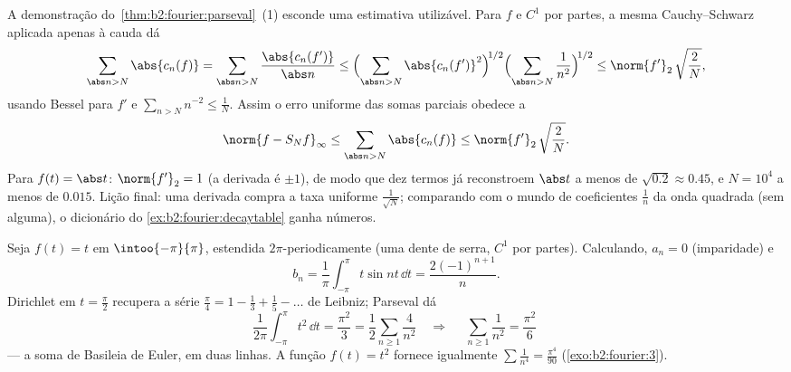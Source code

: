 \begin{example}\label{ex:b2:fourier:tailbound}
A demonstração do~\cref{thm:b2:fourier:parseval}~(1) esconde uma
estimativa utilizável. Para $f$  e $C^1$ por partes, a mesma
Cauchy--Schwarz aplicada apenas à cauda dá
\[
\sum_{\abs n > N}\abs{c_n(f)}
= \sum_{\abs n > N}\frac{\abs{c_n(f')}}{\abs n}
\leq \Bigl(\sum_{\abs n > N}\abs{c_n(f')}^2\Bigr)^{\!1/2}
\Bigl(\sum_{\abs n>N}\frac{1}{n^2}\Bigr)^{\!1/2}
\leq \norm{f'}_2\,\sqrt{\frac{2}{N}} ,
\]
usando Bessel para $f'$ e $\sum_{n>N}n^{-2} \leq \frac1N$. Assim
o erro uniforme das somas parciais obedece a
\[
\norm{f - S_Nf}_\infty
\leq \sum_{\abs n>N}\abs{c_n(f)}
\leq \norm{f'}_2\,\sqrt{\frac2N} .
\]
Para $f(t) = \abs t$: $\norm{f'}_2 = 1$ (a derivada é
$\pm1$), de modo que dez termos já reconstroem $\abs t$ 
a menos de $\sqrt{0.2} \approx 0.45$, e $N = 10^4$ a menos de
$0.015$. Lição final: uma derivada compra a taxa
uniforme $\frac{1}{\sqrt N}$; comparando com o mundo de coeficientes
$\frac1n$ da onda quadrada (sem  alguma), o dicionário do
\cref{ex:b2:fourier:decaytable} ganha números.
\end{example}

\begin{example}\label{ex:b2:fourier:basel}
Seja $f(t) = t$ em $\intoo{-\pi}{\pi}$, estendida
$2\pi$-periodicamente (uma dente de serra, $C^1$ por partes). Calculando, $a_n = 0$ (imparidade) e
\[
b_n = \frac{1}{\pi}\int_{-\pi}^{\pi} t\sin nt\,\dd t
= \frac{2(-1)^{n+1}}{n} .
\]
Dirichlet em $t = \frac\pi2$ recupera a série $\frac\pi4 = 1 -
\frac13 + \frac15 - \dots$ de Leibniz; Parseval dá
\[
\frac{1}{2\pi}\int_{-\pi}^{\pi} t^2\,\dd t = \frac{\pi^2}{3}
= \frac12\sum_{n\geq1}\frac{4}{n^2}
\quad\Longrightarrow\quad
\boxed{\;\sum_{n\geq1}\frac{1}{n^2} = \frac{\pi^2}{6}\;}
\]
--- a soma de Basileia de Euler, em duas linhas. A função $f(t) = t^2$
fornece igualmente $\sum \frac1{n^4} = \frac{\pi^4}{90}$
(\cref{exo:b2:fourier:3}).
\end{example}

